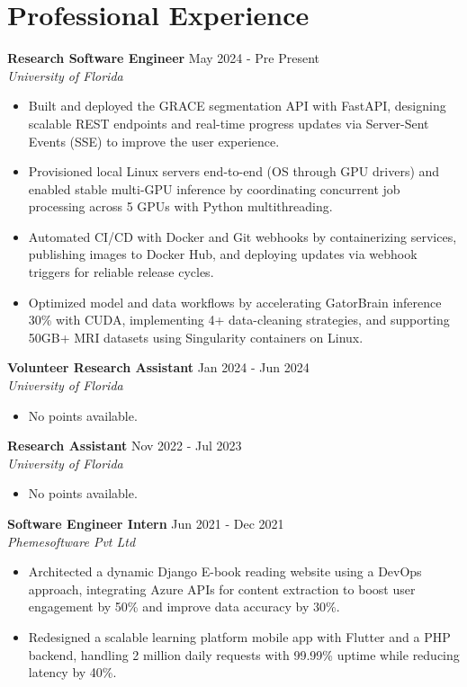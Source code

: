 \documentclass[a4paper,10pt]{article}
\begin{document}
\section*{Professional Experience}
\vspace{-3pt}
\textbf{Research Software Engineer} \hfill May 2024 - Pre Present \\
\textit{University of Florida}
\begin{itemize}
\item Built and deployed the GRACE segmentation API with FastAPI, designing scalable REST endpoints and real-time progress updates via Server-Sent Events (SSE) to improve the user experience.
\item Provisioned local Linux servers end-to-end (OS through GPU drivers) and enabled stable multi-GPU inference by coordinating concurrent job processing across 5 GPUs with Python multithreading.
\item Automated CI/CD with Docker and Git webhooks by containerizing services, publishing images to Docker Hub, and deploying updates via webhook triggers for reliable release cycles.
\item Optimized model and data workflows by accelerating GatorBrain inference 30\% with CUDA, implementing 4+ data-cleaning strategies, and supporting 50GB+ MRI datasets using Singularity containers on Linux.
\end{itemize}
\vspace{-6pt}
\textbf{Volunteer Research Assistant} \hfill Jan 2024 - Jun 2024 \\
\textit{University of Florida}
\begin{itemize}
\item No points available.
\end{itemize}
\vspace{-6pt}
\textbf{Research Assistant} \hfill Nov 2022 - Jul 2023 \\
\textit{University of Florida}
\begin{itemize}
\item No points available.
\end{itemize}
\vspace{-6pt}
\textbf{Software Engineer Intern} \hfill Jun 2021 - Dec 2021 \\
\textit{Phemesoftware Pvt Ltd}
\begin{itemize}
\item Architected a dynamic Django E-book reading website using a DevOps approach, integrating Azure APIs for content extraction to boost user engagement by 50\% and improve data accuracy by 30\%.
\item Redesigned a scalable learning platform mobile app with Flutter and a PHP backend, handling 2 million daily requests with 99.99\% uptime while reducing latency by 40\%.
\end{itemize}
\end{document}
